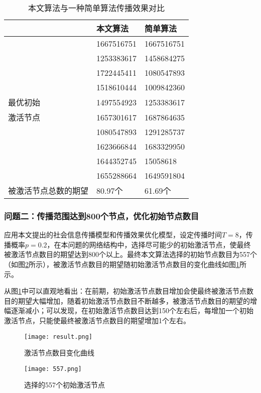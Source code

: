 \documentclass[UTF8]{ctexart}
\begin{document}
\begin{table}[h!]
	\centering
	\begin{tabular}{|m{2cm}<{\centering}|m{4cm}<{\centering}|m{4cm}<{\centering}|}
		\hline
		&本文算法 & 简单算法 \\
		\hline
		&1667516751 & 1667516751 \\
		\cline{2-3}
		&1253383617 &1458684275\\
		\cline{2-3}
		&1722445411 &1080547893\\
		\cline{2-3}
		&1518610444 &1009842360\\
		\cline{2-3}
		最优初始&1497554923 &1253383617\\
		\cline{2-3}
		激活节点&1657301617 &1687864635\\
		\cline{2-3}
		&1080547893 &1291285737\\
		\cline{2-3}
		&1623666844 &1683329950\\
		\cline{2-3}
		&1644352745 &15058618\\
		\cline{2-3}
		&1655288664 & 1649591804\\
		\hline
		被激活节点总数的期望 & 80.97个 & 61.69个 \\
		\hline
	\end{tabular}
	\caption{本文算法与一种简单算法传播效果对比}
	\label{对比}
\end{table}

\subsubsection{问题二：传播范围达到800个节点，优化初始节点数目}
应用本文提出的社会信息传播模型和传播效果优化模型，设定传播时间$T=8$，传播概率$p=0.2$，在本问题的网络结构中，选择尽可能少的初始激活节点，使最终被激活节点数目的期望达到800个以上。最终本文算法选择的初始节点数目为557个（如图\ref{557}所示），被激活节点数目的期望随初始激活节点数目的变化曲线如图\ref{result}所示。

从图\ref{result}中可以直观地看出：在前期，初始激活节点数目增加会使最终被激活节点数目的期望大幅增加，随着初始激活节点数目不断越多，被激活节点数目的期望的增幅逐渐减小；可以发现，在初始激活节点数目达到150个左右后，每增加一个初始激活节点，只能使最终被激活节点数目的期望增加1个左右。

\begin{figure}[h!]
	\centering
	\texttt{[image: result.png]}
	\caption{激活节点数目变化曲线}
	\label{result}
\end{figure}

\begin{figure}[h!]
	\centering
	\texttt{[image: 557.png]}
	\caption{选择的557个初始激活节点}
	\label{557}
\end{figure}
\end{document}
